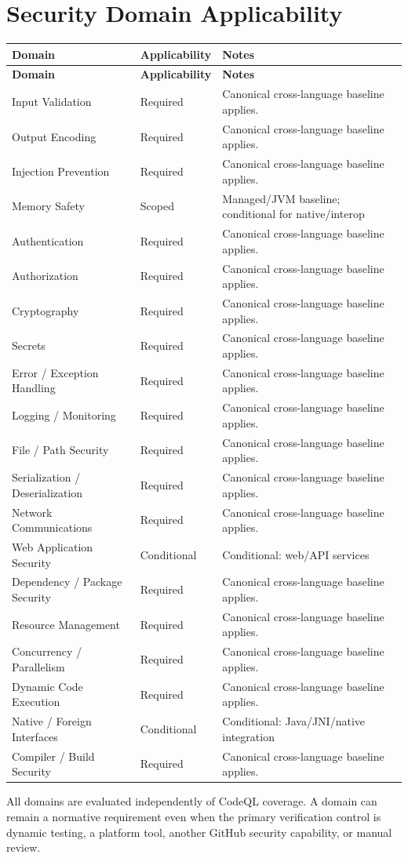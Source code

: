 \documentclass[10pt,letterpaper]{article}
\begin{document}
\section{Security Domain Applicability}
\small
\setlength{\tabcolsep}{3pt}
\begin{longtable}{@{}P{1.8in}P{0.85in}P{3.75in}@{}}
\toprule
\textbf{Domain} & \textbf{Applicability} & \textbf{Notes}\\
\midrule
\endfirsthead
\toprule
\textbf{Domain} & \textbf{Applicability} & \textbf{Notes}\\
\midrule
\endhead
Input Validation & Required & Canonical cross-language baseline applies.\\
Output Encoding & Required & Canonical cross-language baseline applies.\\
Injection Prevention & Required & Canonical cross-language baseline applies.\\
Memory Safety & Scoped & Managed/JVM baseline; conditional for native/interop\\
Authentication & Required & Canonical cross-language baseline applies.\\
Authorization & Required & Canonical cross-language baseline applies.\\
Cryptography & Required & Canonical cross-language baseline applies.\\
Secrets & Required & Canonical cross-language baseline applies.\\
Error / Exception Handling & Required & Canonical cross-language baseline applies.\\
Logging / Monitoring & Required & Canonical cross-language baseline applies.\\
File / Path Security & Required & Canonical cross-language baseline applies.\\
Serialization / Deserialization & Required & Canonical cross-language baseline applies.\\
Network Communications & Required & Canonical cross-language baseline applies.\\
Web Application Security & Conditional & Conditional: web/API services\\
Dependency / Package Security & Required & Canonical cross-language baseline applies.\\
Resource Management & Required & Canonical cross-language baseline applies.\\
Concurrency / Parallelism & Required & Canonical cross-language baseline applies.\\
Dynamic Code Execution & Required & Canonical cross-language baseline applies.\\
Native / Foreign Interfaces & Conditional & Conditional: Java/JNI/native integration\\
Compiler / Build Security & Required & Canonical cross-language baseline applies.\\
\bottomrule
\end{longtable}
\normalsize
All domains are evaluated independently of CodeQL coverage. A domain can remain a normative requirement even when the primary verification control is dynamic testing, a platform tool, another GitHub security capability, or manual review.
\end{document}
